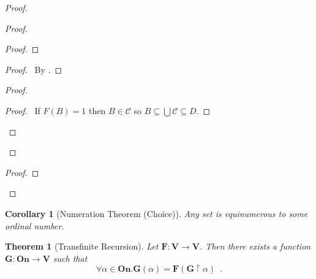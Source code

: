 \documentclass{report}
\let\qed\relax
\newtheorem{theorem}[axiom]{Theorem}
\newtheorem{corollary}{Corollary}[axiom]
\theoremstyle{definition}
\newcommand{\dom}{\ensuremath{\operatorname{dom}}}
\begin{document}
\begin{proof}
\begin{proof}
            \begin{proof}
            \end{proof}
            \begin{proof}
                \pf\ By .
            \end{proof}
            \begin{proof}
                \begin{proof}
                    \pf\ If $F(B) = 1$ then $B \in \mathcal{C}$ so $B \subseteq \bigcup \mathcal{C} \subseteq D$.
                \end{proof}
            \end{proof}
        \end{proof}
        \begin{proof}
            \step{f}{$\dom F = \dom R$}
        \end{proof}
        \qed
    \end{proof}

    \begin{corollary}[Numeration Theorem (Choice)]
        Any set is equinumerous to some ordinal number.
    \end{corollary}

    \begin{theorem}[Transfinite Recursion]
        Let $\mathbf{F} : \mathbf{V} \rightarrow \mathbf{V}$. Then there exists a function $\mathbf{G}
        : \mathbf{On} \rightarrow \mathbf{V}$ such that
        \[ \forall \alpha \in \mathbf{On}. \mathbf{G}(\alpha) = \mathbf{F}(\mathbf{G} \restriction \alpha)
        \enspace . \]
    \end{theorem}
\end{document}
